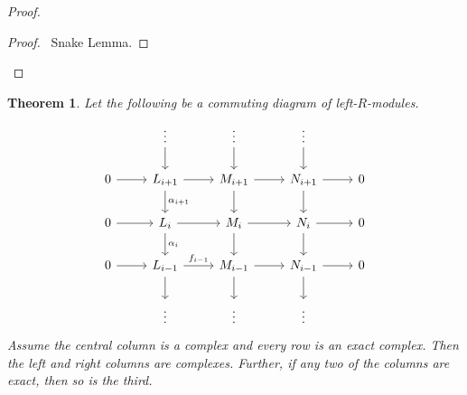 \documentclass{book}
\let\qed\relax
\newtheorem{thm}[prop]{Theorem}
\theoremstyle{definition}
\begin{document}
\begin{proof}
\pf
{}
\begin{proof}
	\pf\ Snake Lemma.
\end{proof}
\qed
\end{proof}

\begin{thm}
Let the following be a commuting diagram of left-$R$-modules.
\[ \begin{tikzcd}
& \vdots \arrow[d] & \vdots \arrow[d] & \vdots \arrow[d] \\
0 \arrow[r] & L_{i+1} \arrow[r] \arrow[d,"\alpha_{i+1}"] & M_{i+1} \arrow[r] \arrow[d] & N_{i+1} \arrow[r] \arrow[d] & 0 \\
0 \arrow[r] & L_i \arrow[r] \arrow[d,"\alpha_i"] & M_i \arrow[r] \arrow[d] & N_i \arrow[r] \arrow[d] & 0 \\
0 \arrow[r] & L_{i-1} \arrow[r,"f_{i-1}"] \arrow[d] & M_{i-1} \arrow[r] \arrow[d] & N_{i-1} \arrow[r] \arrow[d] & 0 \\
& \vdots & \vdots & \vdots
\end{tikzcd} \]
Assume the central column is a complex and every row is an exact complex. Then the left and right columns are complexes. Further, if any two of the columns are exact, then so is the third.
\end{thm}
\end{document}
